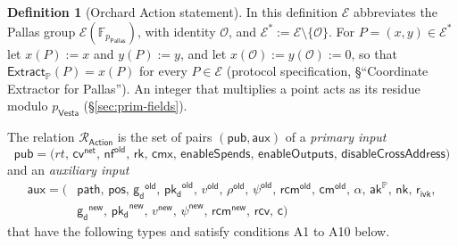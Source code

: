 \documentclass[11pt,a4paper]{article}
\theoremstyle{definition}
\newtheorem{definition}[theorem]{Definition}
\newcommand{\F}{\mathbb{F}}
\newcommand{\PP}{\mathbb{P}}
\newcommand{\Rel}{\mathcal{R}}
\newcommand{\nfsym}{\mathsf{nf}}
\newcommand{\cmsym}{\mathsf{cm}}
\newcommand{\cmx}{\mathsf{cmx}}
\newcommand{\cvsym}{\mathsf{cv}}
\newcommand{\rk}{\mathsf{rk}}
\newcommand{\Pallas}{\ensuremath{\mathsf{Pallas}}}
\newcommand{\Vesta}{\ensuremath{\mathsf{Vesta}}}
\newcommand{\Ep}{\ensuremath{\mathcal{E}}}
\newcommand{\Extract}{\ensuremath{\mathsf{Extract}}}
\newcommand{\aksym}{\ensuremath{\mathsf{ak}}}
\newcommand{\nksym}{\ensuremath{\mathsf{nk}}}
\newcommand{\pkd}{\ensuremath{\mathsf{pk_d}}}
\newcommand{\gd}{\ensuremath{\mathsf{g_d}}}
\newcommand{\rcv}{\ensuremath{\mathsf{rcv}}}
\newcommand{\rcm}{\ensuremath{\mathsf{rcm}}}
\newcommand{\rivk}{\ensuremath{\mathsf{r_{ivk}}}}
\begin{document}
\begin{definition}[Orchard Action statement]\label{def:action}
In this definition $\Ep$ abbreviates the Pallas group
$\Ep(\F_{p_{\Pallas}})$, with identity $\mathcal{O}$, and
$\Ep^{*} := \Ep \setminus \{\mathcal{O}\}$. For $P = (x, y) \in \Ep^{*}$ let
$x(P) := x$ and $y(P) := y$, and let $x(\mathcal{O}) := y(\mathcal{O}) := 0$,
so that $\Extract_{\PP}(P) = x(P)$ for every $P \in \Ep$ (protocol
specification, \S``Coordinate Extractor for Pallas''). An integer that
multiplies a point acts as its residue modulo $p_{\Vesta}$
(\S\ref{sec:prim-fields}).

The relation $\Rel_{\mathsf{Action}}$ is the set of pairs
$(\mathsf{pub}, \mathsf{aux})$ of a \emph{primary input}
\[
  \mathsf{pub} = \bigl(\mathit{rt},\, \cvsym^{\mathsf{net}},\,
    \nfsym^{\mathsf{old}},\, \rk,\, \cmx,\, \mathsf{enableSpends},\,
    \mathsf{enableOutputs},\, \mathsf{disableCrossAddress}\bigr)
\]
and an \emph{auxiliary input}
\begin{align*}
  \mathsf{aux} = \bigl(&\mathsf{path},\, \mathsf{pos},\,
    \gd^{\mathsf{old}},\, \pkd^{\mathsf{old}},\, v^{\mathsf{old}},\,
    \rho^{\mathsf{old}},\, \psi^{\mathsf{old}},\, \rcm^{\mathsf{old}},\,
    \cmsym^{\mathsf{old}},\, \alpha,\, \aksym^{\PP},\, \nksym,\, \rivk, \\
  &\gd^{\mathsf{new}},\, \pkd^{\mathsf{new}},\, v^{\mathsf{new}},\,
    \psi^{\mathsf{new}},\, \rcm^{\mathsf{new}},\, \rcv,\, \mathsf{c}\bigr)
\end{align*}
that have the following types and satisfy conditions A1 to A10 below.
\end{definition}
\end{document}

